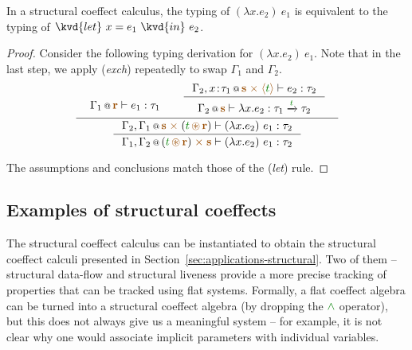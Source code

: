 \begin{remark}
In a structural coeffect calculus, the typing of $(\lambda x.e_2)~e_1$ is equivalent
to the typing of $\kvd{let}~x=e_1~\kvd{in}~e_2$.
\end{remark}
\begin{proof}
Consider the following typing derivation for $(\lambda x.e_2)~e_1$. Note that 
in the last step, we apply (\emph{exch}) repeatedly to swap $\Gamma_1$ and $\Gamma_2$. 
%
\begin{equation*}
\inference
  { \begin{array}{l}\coctx{\Gamma_1}{\aclrd{\textbf{r}}} \vdash e_1 : \tau_1\vspace{-1.6em}\end{array} &
    \inference
      { \coctx{\Gamma_2, x\!:\!\tau_1}{\aclrd{\textbf{s}}\;\atimes\;\alift{\cclrd{t}}} \vdash e_2 : \tau_2 }
      { \coctx{\Gamma_2}{\aclrd{\textbf{s}}} \vdash \lambda x.e_2 : \tau_1 \xrightarrow{\cclrd{t}} \tau_2} \vspace{0.2em} }
  { \inference
      { \coctx{\Gamma_2, \Gamma_1}{\aclrd{\textbf{s}} \;\atimes\; (\cclrd{t} \,\aseq\, \aclrd{\textbf{r}})} \vdash (\lambda x.e_2)~e_1 : \tau_2 }
      { \coctx{\Gamma_1, \Gamma_2}{(\cclrd{t} \,\aseq\, \aclrd{\textbf{r}}) \;\atimes\;  \aclrd{\textbf{s}} } \vdash (\lambda x.e_2)~e_1 : \tau_2 } }
\end{equation*}

\noindent
The assumptions and conclusions match those of the (\emph{let}) rule. 
\end{proof}



\subsection{Examples of structural coeffects}

The structural coeffect calculus can be instantiated to obtain the structural coeffect calculi
presented in Section~\ref{sec:applications-structural}. Two of them -- structural data-flow and
structural liveness provide a more precise tracking of properties that can be tracked using 
flat systems. Formally, a flat coeffect algebra can be turned into a structural coeffect algebra
(by dropping the $\czip$ operator), but this does not always give us a meaningful system -- for
example, it is not clear why one would associate implicit parameters with individual variables.


